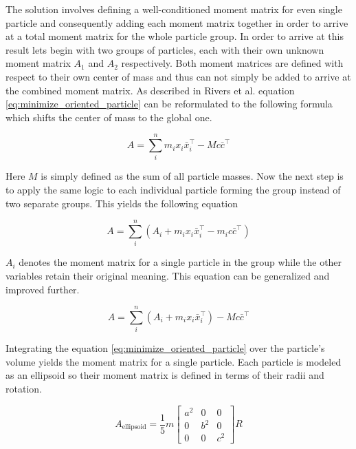 The solution involves defining a well-conditioned moment matrix for even single particle and consequently adding each moment matrix together in order to arrive at a total moment matrix for the whole particle group. In order to arrive at this result lets begin with two groups of particles, each with their own unknown moment matrix $A_1$ and $A_2$ respectively. Both moment matrices are defined with respect to their own center of mass and thus can not simply be added to arrive at the combined moment matrix. As described in Rivers et al. \cite{Rivers:2007te} equation \ref{eq:minimize_oriented_particle} can be reformulated to the following formula which shifts the center of mass to the global one.

\begin{equation}
A = \sum\limits_i^n m_ix_i\bar{x}_i^\top - Mc\bar{c}^\top
\label{eq:minimize_oriented_particle}
\end{equation}

Here $M$ is simply defined as the sum of all particle masses. Now the next step is to apply the same logic to each individual particle forming the group instead of two separate groups. This yields the following equation

\begin{equation}
A = \sum\limits_i^n (A_i + m_ix_i\bar{x}_i^\top-m_ic\bar{c}^\top)
\end{equation}

$A_i$ denotes the moment matrix for a single particle in the group while the other variables retain their original meaning. This equation can be generalized and improved further.

\begin{equation}
A = \sum\limits_i^n (A_i + m_ix_i\bar{x}_i^\top) - Mc\bar{c}^\top
\end{equation}

Integrating the equation \ref{eq:minimize_oriented_particle} over the particle's volume yields the moment matrix for a single particle. Each particle is modeled as an ellipsoid so their moment matrix is defined in terms of their radii and rotation.

\begin{equation}
A_{\text{ellipsoid}} = \frac{1}{5}m \begin{bmatrix} a^2 & 0 & 0 \\ 0 & b^2 & 0 \\ 0 & 0 & c^2  \end{bmatrix} R
\end{equation}

